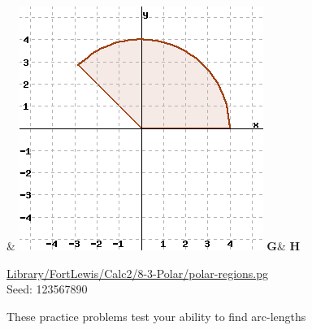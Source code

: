 \documentclass[10pt,]{book}
\theoremstyle{plain}
\theoremstyle{definition}
\theoremstyle{definition}
\theoremstyle{definition}
\theoremstyle{definition}
\theoremstyle{definition}
\numberwithin{equation}{section}
\begin{document}
\begin{exercisegroup}
\begin{mdframed}
{{{{{{& \includegraphics[width=0.25\linewidth]{webwork-tex/webwork-28-image-8.png}
\cr
\hfil \textbf{G}& \hfil \textbf{H}\cr}}\kern 5pt}\medskip
}}\medskip


}\par\vspace*{2ex}%
{\tiny\ttfamily\noindent\url{Library/FortLewis/Calc2/8-3-Polar/polar-regions.pg}\\Seed: 123567890\hfill}\end{mdframed}
\end{exercisegroup}
\par\smallskip\noindent
\hypertarget{exercisegroup-5}{}\par\noindent These practice problems test your ability to find arc-lengths%
\end{document}
